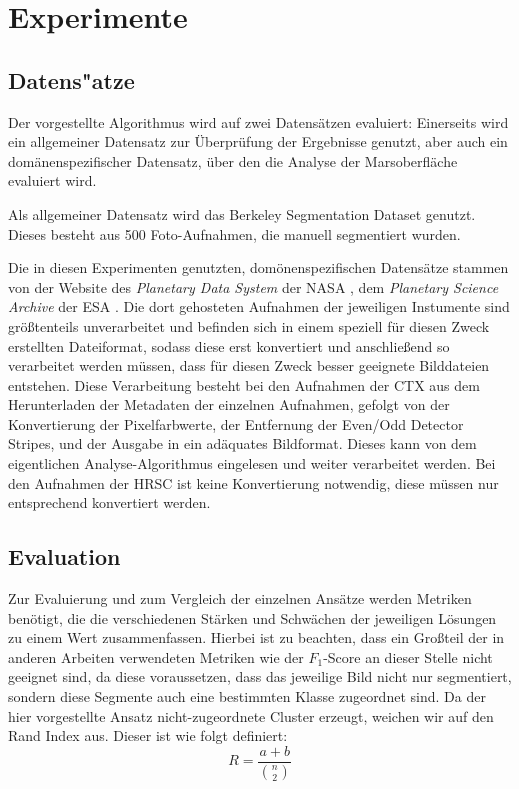 \iffalse
\chapter{Experimente}
\label{chap:experimente}

\section{Datens"atze}
\label{sec:datensätze}

Der vorgestellte Algorithmus wird auf zwei Datensätzen evaluiert: Einerseits wird ein allgemeiner Datensatz zur Überprüfung der Ergebnisse genutzt, aber auch ein domänenspezifischer Datensatz, über den die Analyse der Marsoberfläche evaluiert wird. 

Als allgemeiner Datensatz wird das Berkeley Segmentation Dataset \cite{bsd500} genutzt. Dieses besteht aus 500 Foto-Aufnahmen, die manuell segmentiert wurden.

Die in diesen Experimenten genutzten, domönenspezifischen Datensätze stammen von der Website des \textit{Planetary Data System} der NASA \cite{pds}, \bzw dem \textit{Planetary Science Archive} der ESA \cite{psa}. Die dort gehosteten Aufnahmen der jeweiligen Instumente sind größtenteils unverarbeitet und befinden sich in einem speziell für diesen Zweck erstellten Dateiformat, sodass diese erst konvertiert und anschließend so verarbeitet werden müssen, dass für diesen Zweck besser geeignete Bilddateien entstehen.
Diese Verarbeitung besteht bei den Aufnahmen der CTX aus dem Herunterladen der Metadaten der einzelnen Aufnahmen, gefolgt von der Konvertierung der Pixelfarbwerte, der Entfernung der Even/Odd Detector Stripes, und der Ausgabe in ein adäquates Bildformat. Dieses kann von dem eigentlichen Analyse-Algorithmus eingelesen und weiter verarbeitet werden. Bei den Aufnahmen der HRSC ist keine Konvertierung notwendig, diese müssen nur entsprechend konvertiert werden.

\section{Evaluation}
\label{sec:Evaluation}

Zur Evaluierung und zum Vergleich der einzelnen Ansätze werden Metriken benötigt, die die verschiedenen Stärken und Schwächen der jeweiligen Lösungen zu einem Wert zusammenfassen. Hierbei ist zu beachten, dass ein Großteil der in anderen Arbeiten verwendeten Metriken wie \bspw der $F_1$-Score an dieser Stelle nicht geeignet sind, da diese voraussetzen, dass das jeweilige Bild nicht nur segmentiert, sondern diese Segmente auch eine bestimmten Klasse zugeordnet sind. Da der hier vorgestellte Ansatz nicht-zugeordnete Cluster erzeugt, weichen wir auf den Rand Index\cite{randindex} aus. Dieser ist wie folgt definiert:
\[R=\frac{a+b}{\binom{n}{2}}\]


